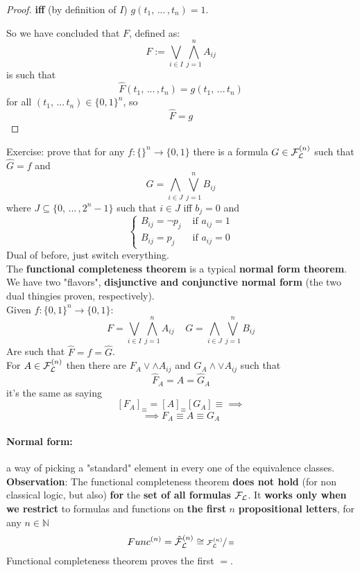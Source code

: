\begin{proof}
		\textbf{iff } (by definition of $I$) $g(t_1, \, ... \, , t_n) = 1$.\\

		\newpage

		So we have concluded that $F$, defined as:
		$$ F := \bigvee_{i \in I} \bigwedge_{j=1}^n A_{ij}$$
		is such that
		$$ \hat F (t_1, \, ... \, , t_n) = g(t_1, \, ... \, t_n) $$
		for all $(t_1, \, ... \, t_n) \in \{0,1\}^n$, so
		$$ \hat F = g $$
	\end{proof}

	Exercise: prove that for any $f: \{\}^n \rightarrow \{0,1\}$ there is a formula $G \in \mathcal{F}_\mathcal{L}^{(n)}$ such that $\hat G = f$ and
	$$G = \bigwedge_{i \in J} \bigvee_{j=1}^n B_{ij} $$
	where $J \subseteq \{0, \, ... \, , 2^n - 1\}$ such that $i \in J$ iff $b_j = 0$ and
	$$
	\begin{cases}
		B_{ij} = \neg p_j & \text{ if } a_{ij} = 1 \\
		B_{ij} = p_j & \text{ if } a_{ij} = 0
	\end{cases}
	$$
	Dual of before, just switch everything.\\

	The \textbf{functional completeness theorem} is a typical \textbf{normal form theorem}. We have two "flavors", \textbf{disjunctive and conjunctive normal form} (the two dual thingies proven, respectively).\\

	Given $f: \{0,1\}^n \rightarrow \{0,1\}$:
	$$F  =  \bigvee_{i \in I} \bigwedge_{j=1}^n A_{ij} \;\;\;\; G = \bigwedge_{i \in J} \bigvee_{j=1}^n B_{ij} $$
	Are such that $\hat F = f = \hat G$.\\

	For  $A \in \mathcal{F}_\mathcal{L}^{(n)}$ then there are $F_A \vee \wedge A_{ij}$ and $G_A \wedge \vee A_{ij}$ such that
	$$ \hat F_A = \hat A = \hat G_A$$
	it's the same as saying
	$$ [F_A]_\equiv = [A]_\equiv [G_A]\equiv \implies$$
	$$ \implies F_A \equiv A \equiv G_A $$


	\paragraph{Normal form:} a way of picking a "standard" element in every one of the equivalence classes.\\

	\textbf{Observation}: The functional completeness theorem \textbf{does not hold} (for non classical logic, but also) \textbf{for} the \textbf{set of all formulas} $\mathcal{F}_\mathcal{L}$. It \textbf{works only when we restrict} to formulas and functions on \textbf{the first} $n$ \textbf{propositional letters}, for any $n \in \mathbb{N}$
	$$ Func^{(n)} = \hat{\mathcal{F}}_\mathcal{L}^{(n)} \cong \sfrac{\mathcal{F}_\mathcal{L}^{(n)}}{\equiv} $$
	Functional completeness theorem proves the first $=$.\\

